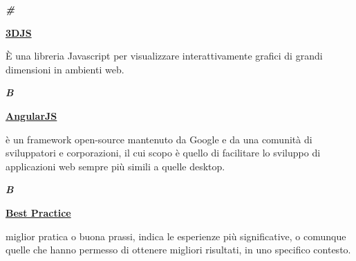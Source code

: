 \cleardoublepage
{}
{}
\noindent\hrulefill\hspace{4mm}\textbf{\textsl{\Huge{\#}}}\hspace{4mm}\hrulefill

\vspace*{2\bigskipamount}

\begin{addmargin}[0em]{0em}	
	\textbf{\underline{3DJS}} 
\end{addmargin}
	
\medskip
\begin{addmargin}[5em]{1em}	
È una libreria Javascript per visualizzare interattivamente grafici di grandi dimensioni in ambienti web.
\end{addmargin}

\newpage

\cleardoublepage
{}
{}
\noindent\hrulefill\hspace{4mm}\textbf{\textsl{\Huge{B}}}\hspace{4mm}\hrulefill

\vspace*{2\bigskipamount}

\begin{addmargin}[0em]{0em}
	\textbf{\underline{AngularJS}} 
\end{addmargin}
	
\medskip
\begin{addmargin}[5em]{1em}
è un framework open-source mantenuto da Google e da una comunità di sviluppatori e corporazioni, il cui scopo è quello di facilitare lo sviluppo di applicazioni web sempre più simili a quelle desktop.
\end{addmargin}

\newpage

\cleardoublepage
{}
{}
\noindent\hrulefill\hspace{4mm}\textbf{\textsl{\Huge{B}}}\hspace{4mm}\hrulefill

\vspace*{2\bigskipamount}

\begin{addmargin}[0em]{0em}
	\textbf{\underline{Best Practice}} 
\end{addmargin}
	
\medskip
\begin{addmargin}[5em]{1em}
miglior pratica o buona prassi, indica le esperienze più significative, o comunque quelle che hanno permesso di ottenere migliori risultati, in uno specifico contesto.
\end{addmargin}

